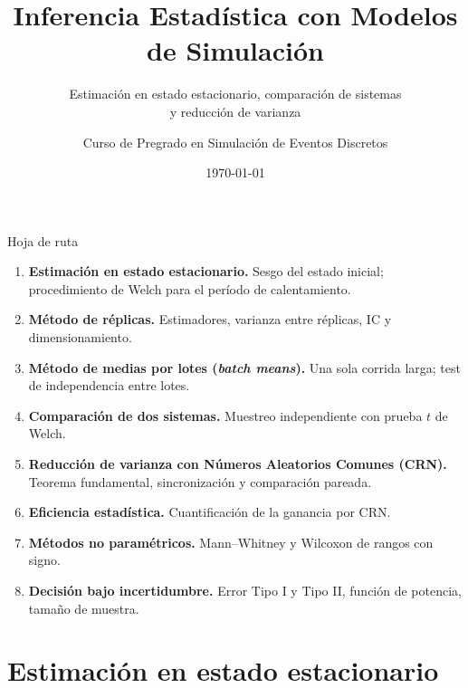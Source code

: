 \documentclass[aspectratio=1610, 10pt]{beamer}
\title[Análisis de Salidas]{Inferencia Estadística con Modelos de Simulación}
\subtitle{Estimación en estado estacionario, comparación de sistemas \\ y reducción de varianza}
\author[Análisis de Salidas]{Curso de Pregrado en Simulación de Eventos Discretos}
\institute[]{Departamento de Ingeniería Industrial}
\date{\today}
\begin{document}

\begin{frame}
  \titlepage
\end{frame}

\begin{frame}{Hoja de ruta}
\begin{enumerate}
\item \textbf{Estimación en estado estacionario.} Sesgo del estado inicial; procedimiento de Welch para el período de calentamiento.
\item \textbf{Método de réplicas.} Estimadores, varianza entre réplicas, IC y dimensionamiento.
\item \textbf{Método de medias por lotes (\emph{batch means}).} Una sola corrida larga; test de independencia entre lotes.
\item \textbf{Comparación de dos sistemas.} Muestreo independiente con prueba $t$ de Welch.
\item \textbf{Reducción de varianza con Números Aleatorios Comunes (CRN).} Teorema fundamental, sincronización y comparación pareada.
\item \textbf{Eficiencia estadística.} Cuantificación de la ganancia por CRN.
\item \textbf{Métodos no paramétricos.} Mann--Whitney y Wilcoxon de rangos con signo.
\item \textbf{Decisión bajo incertidumbre.} Error Tipo I y Tipo II, función de potencia, tamaño de muestra.
\end{enumerate}
\end{frame}

\section{Estimación en estado estacionario}
\end{document}
